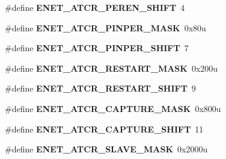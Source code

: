 \begin{DoxyCompactItemize}
\item 
\#define {\bfseries E\+N\+E\+T\+\_\+\+A\+T\+C\+R\+\_\+\+P\+E\+R\+E\+N\+\_\+\+S\+H\+I\+FT}~4\hypertarget{group__ENET__Register__Masks_gaa3174823ddaff2166b78849f64a51785}{}\label{group__ENET__Register__Masks_gaa3174823ddaff2166b78849f64a51785}

\item 
\#define {\bfseries E\+N\+E\+T\+\_\+\+A\+T\+C\+R\+\_\+\+P\+I\+N\+P\+E\+R\+\_\+\+M\+A\+SK}~0x80u\hypertarget{group__ENET__Register__Masks_ga77bb996851465816022bc4775156bcfc}{}\label{group__ENET__Register__Masks_ga77bb996851465816022bc4775156bcfc}

\item 
\#define {\bfseries E\+N\+E\+T\+\_\+\+A\+T\+C\+R\+\_\+\+P\+I\+N\+P\+E\+R\+\_\+\+S\+H\+I\+FT}~7\hypertarget{group__ENET__Register__Masks_ga132378b49192464e6f7f3246b9c07d11}{}\label{group__ENET__Register__Masks_ga132378b49192464e6f7f3246b9c07d11}

\item 
\#define {\bfseries E\+N\+E\+T\+\_\+\+A\+T\+C\+R\+\_\+\+R\+E\+S\+T\+A\+R\+T\+\_\+\+M\+A\+SK}~0x200u\hypertarget{group__ENET__Register__Masks_ga3a0c41e65b6be0a4ecf7952cd4ba33a9}{}\label{group__ENET__Register__Masks_ga3a0c41e65b6be0a4ecf7952cd4ba33a9}

\item 
\#define {\bfseries E\+N\+E\+T\+\_\+\+A\+T\+C\+R\+\_\+\+R\+E\+S\+T\+A\+R\+T\+\_\+\+S\+H\+I\+FT}~9\hypertarget{group__ENET__Register__Masks_ga5920e6dc52564ba30bf8426b5cc14071}{}\label{group__ENET__Register__Masks_ga5920e6dc52564ba30bf8426b5cc14071}

\item 
\#define {\bfseries E\+N\+E\+T\+\_\+\+A\+T\+C\+R\+\_\+\+C\+A\+P\+T\+U\+R\+E\+\_\+\+M\+A\+SK}~0x800u\hypertarget{group__ENET__Register__Masks_gacd8fe80e2e9c0c195beaf224632d0e65}{}\label{group__ENET__Register__Masks_gacd8fe80e2e9c0c195beaf224632d0e65}

\item 
\#define {\bfseries E\+N\+E\+T\+\_\+\+A\+T\+C\+R\+\_\+\+C\+A\+P\+T\+U\+R\+E\+\_\+\+S\+H\+I\+FT}~11\hypertarget{group__ENET__Register__Masks_gad427aa0f3d7b6595aaf79996904fe1ff}{}\label{group__ENET__Register__Masks_gad427aa0f3d7b6595aaf79996904fe1ff}

\item 
\#define {\bfseries E\+N\+E\+T\+\_\+\+A\+T\+C\+R\+\_\+\+S\+L\+A\+V\+E\+\_\+\+M\+A\+SK}~0x2000u\hypertarget{group__ENET__Register__Masks_ga183333c88147503540c9c79d092d5799}{}\label{group__ENET__Register__Masks_ga183333c88147503540c9c79d092d5799}


\end{DoxyCompactItemize}
